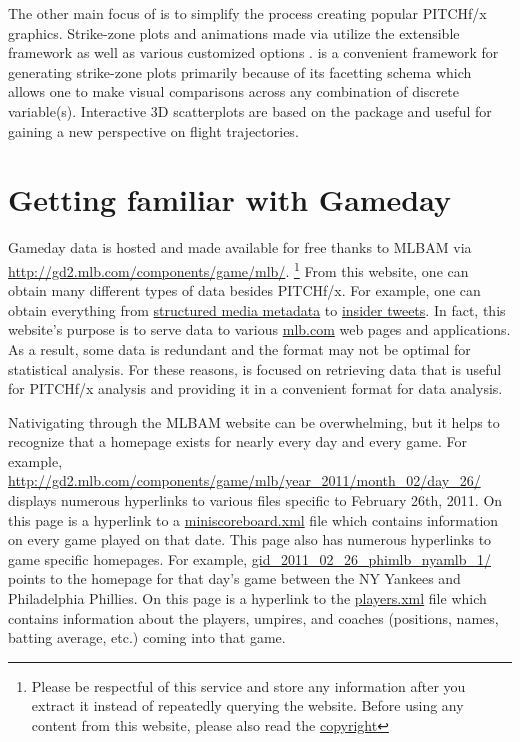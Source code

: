 \begin{article}
The other main focus of  is to simplify the process
creating popular PITCHf/x graphics. Strike-zone plots and animations
made via  utilize the extensible  framework
as well as various customized options \citet{ggplot2}. 
is a convenient framework for generating strike-zone plots primarily
because of its facetting schema which allows one to make visual comparisons
across any combination of discrete variable(s). Interactive 3D scatterplots
are based on the  package and useful for gaining a new perspective
on flight trajectories.


\section{Getting familiar with Gameday}

Gameday data is hosted and made available for free thanks to MLBAM
via \url{http://gd2.mlb.com/components/game/mlb/}.%
\footnote{Please be respectful of this service and store any information after
you extract it instead of repeatedly querying the website. Before
using any content from this website, please also read the \href{http://gdx.mlb.com/components/copyright.txt}{copyright} %
} From this website, one can obtain many different types of data besides
PITCHf/x. For example, one can obtain everything from \href{http://gd2.mlb.com/components/game/mlb/year_2013/month_07/day_16/gid_2013_07_16_aasmlb_nasmlb_1/media/instadium.xml}{structured media metadata}
to \href{http://gd2.mlb.com/components/game/mlb/twitter/anaInsiderTweets.xml}{insider tweets}.
In fact, this website's purpose is to serve data to various \href{http://mlb.com}{mlb.com}
web pages and applications. As a result, some data is redundant and
the format may not be optimal for statistical analysis. For these
reasons,  is focused on retrieving data that is useful
for PITCHf/x analysis and providing it in a convenient format for
data analysis. 

Nativigating through the MLBAM website can be overwhelming, but it
helps to recognize that a homepage exists for nearly every day and
every game. For example, \url{http://gd2.mlb.com/components/game/mlb/year_2011/month_02/day_26/}
displays numerous hyperlinks to various files specific to February
26th, 2011. On this page is a hyperlink to a \href{http://gd2.mlb.com/components/game/mlb/year_2011/month_02/day_26/miniscoreboard.xml}{miniscoreboard.xml}
file which contains information on every game played on that date.
This page also has numerous hyperlinks to game specific homepages.
For example, \href{http://gd2.mlb.com/components/game/mlb/year_2011/month_02/day_26/gid_2011_02_26_phimlb_nyamlb_1/}{gid\_2011\_02\_26\_phimlb\_nyamlb\_1/}
points to the homepage for that day's game between the NY Yankees
and Philadelphia Phillies. On this page is a hyperlink to the \href{http://gd2.mlb.com/components/game/mlb/year_2011/month_02/day_26/gid_2011_02_26_phimlb_nyamlb_1/players.xml}{players.xml}
file which contains information about the players, umpires, and coaches
(positions, names, batting average, etc.) coming into that game. 


\end{article}
